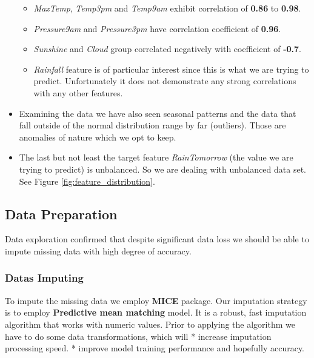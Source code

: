 \begin{itemize}
  \begin{itemize}
  \tightlist
  \item
    \emph{MaxTemp}, \emph{Temp3pm} and \emph{Temp9am} exhibit
    correlation of \textbf{0.86} to \textbf{0.98}.
  \item
    \emph{Pressure9am} and \emph{Pressure3pm} have correlation
    coefficient of \textbf{0.96}.
  \item
    \emph{Sunshine} and \emph{Cloud} group correlated negatively with
    coefficient of \textbf{-0.7}.
  \item
    \emph{Rainfall} feature is of particular interest since this is what
    we are trying to predict. Unfortunately it does not demonstrate any
    strong correlations with any other features.
  \end{itemize}
\item
  Examining the data we have also seen seasonal patterns and the data
  that fall outside of the normal distribution range by far (outliers).
  Those are anomalies of nature which we opt to keep.
\item
  The last but not least the target feature \emph{RainTomorrow} (the
  value we are trying to predict) is unbalanced. So we are dealing with
  unbalanced data set. See Figure \ref{fig:feature_distribution}.
\end{itemize}

\hypertarget{data-preparation}{%
\subsection{Data Preparation}\label{data-preparation}}

Data exploration confirmed that despite significant data loss we should
be able to impute missing data with high degree of accuracy.

\hypertarget{datas-imputing}{%
\subsubsection{Datas Imputing}\label{datas-imputing}}

To impute the missing data we employ \textbf{MICE} package. Our
imputation strategy is to employ \textbf{Predictive mean matching}
model. It is a robust, fast imputation algorithm that works with numeric
values. Prior to applying the algorithm we have to do some data
transformations, which will * increase imputation processing speed. *
improve model training performance and hopefully accuracy.

